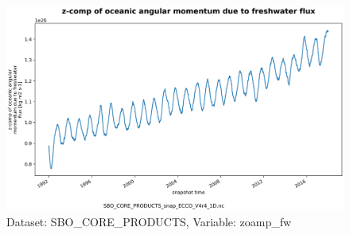 \begin{figure}[H]
\centering
\includegraphics[scale=0.55]{../images/plots/oneD_plots/SBO_Core_Products/zoamp_fw.png}
\caption{Dataset: SBO\_CORE\_PRODUCTS, Variable: zoamp\_fw}
\label{tab:table-SBO_CORE_PRODUCTS_zoamp_fw-Plot}
\end{figure}
\newpage